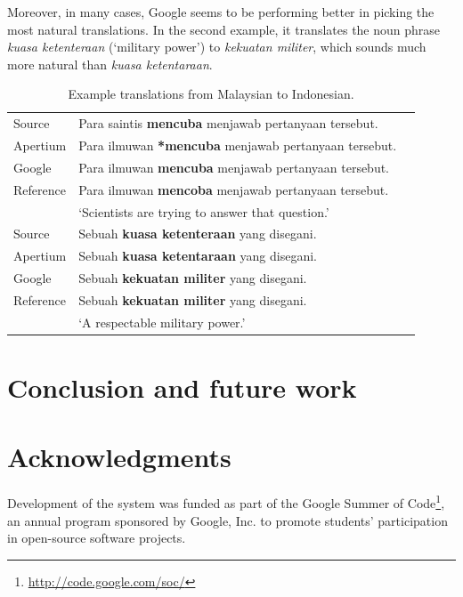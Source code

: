 \documentclass[10pt,a5paper,twoside]{article}
\begin{document}
Moreover, in many cases, Google seems to be performing better in picking the most natural translations. In the second example, it translates the noun phrase \emph{kuasa ketenteraan} (`military power') to \emph{kekuatan militer}, which sounds much more natural than \emph{kuasa ketentaraan}.

\begin{table}[htbp]
  \begin{center}
  \begin{tabular}{llc}
  \toprule
  Source & Para saintis \textbf{mencuba} menjawab pertanyaan tersebut.\\
  Apertium & Para ilmuwan \textbf{*mencuba} menjawab pertanyaan tersebut.\\
  Google & Para ilmuwan \textbf{mencuba} menjawab pertanyaan tersebut.\\
  Reference & Para ilmuwan \textbf{mencoba} menjawab pertanyaan tersebut.\\
  & `Scientists are trying to answer that question.'\\
  \midrule
  Source & Sebuah \textbf{kuasa ketenteraan} yang disegani.\\
  Apertium & Sebuah \textbf{kuasa ketentaraan} yang disegani.\\
  Google & Sebuah \textbf{kekuatan militer} yang disegani.\\
  Reference & Sebuah \textbf{kekuatan militer} yang disegani.\\
  & `A respectable military power.'\\
  \bottomrule
  \end{tabular}
    \caption{Example translations from Malaysian to Indonesian.}
    \label{table:ex}
  \end{center}
\end{table}

\section*{Conclusion and future work}
\label{sec:con}

\section*{Acknowledgments}
Development of the system was funded as part of the Google Summer of Code\footnote{\url{http://code.google.com/soc/}}, an annual program sponsored by Google, Inc. to promote students' participation in open-source software projects.




\nocite{lewis09}
\end{document}
